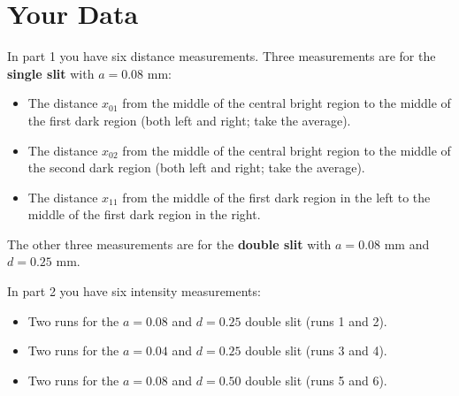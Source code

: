 \section{Your Data}
In part 1 you have six distance measurements. Three measurements are for the \textbf{single slit} with $a = 0.08$ mm:
\begin{itemize}
	\item The distance $x_{01}$ from the middle of the central bright region to the middle of the first dark region (both left and right; take the average).
	\item The distance $x_{02}$ from the middle of the central bright region to the middle of the second dark region (both left and right; take the average).
	\item The distance $x_{11}$ from the middle of the first dark region in the left to the middle of the first dark region in the right.
\end{itemize}
The other three measurements are for the \textbf{double slit} with $a = 0.08$ mm and $d = 0.25$ mm.

In part 2 you have six intensity measurements:
\begin{itemize}
	\item Two runs for the $a = 0.08$ and $d = 0.25$ double slit (runs 1 and 2).
	\item Two runs for the $a = 0.04$ and $d = 0.25$ double slit (runs 3 and 4).
	\item Two runs for the $a = 0.08$ and $d = 0.50$ double slit (runs 5 and 6).
\end{itemize}
\newpage
